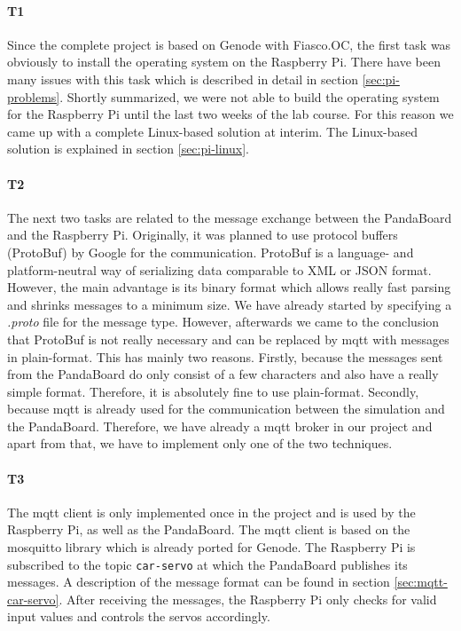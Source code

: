 \paragraph{\textbf{T1}} Since the complete project is based on Genode with Fiasco.OC, the first task was obviously to install the operating system on the Raspberry Pi. There have been many issues with this task which is described in detail in section \ref{sec:pi-problems}. Shortly summarized, we were not able to build the operating system for the Raspberry Pi until the last two weeks of the lab course. For this reason we came up with a complete Linux-based solution at interim. The Linux-based solution is explained in section \ref{sec:pi-linux}.

\paragraph{\textbf{T2}} The next two tasks are related to the message exchange between the PandaBoard and the Raspberry Pi. Originally, it was planned to use protocol buffers (ProtoBuf) by Google for the communication. ProtoBuf is a language- and platform-neutral way of serializing data comparable to XML or JSON format. However, the main advantage is its binary format which allows really fast parsing and shrinks messages to a minimum size. We have already started by specifying a \textit{.proto} file for the message type. However, afterwards we came to the conclusion that ProtoBuf is not really necessary and can be replaced by mqtt with messages in plain-format. This has mainly two reasons. Firstly, because the messages sent from the PandaBoard do only consist of a few characters and also have a really simple format. Therefore, it is absolutely fine to use plain-format. Secondly, because mqtt is already used for the communication between the simulation and the PandaBoard. Therefore, we have already a mqtt broker in our project and apart from that, we have to implement only one of the two techniques.

\paragraph{\textbf{T3}} The mqtt client is only implemented once in the project and is used by the Raspberry Pi, as well as the PandaBoard. The mqtt client is based on the mosquitto library which is already ported for Genode. The Raspberry Pi is subscribed to the topic \texttt{car-servo} at which the PandaBoard publishes its messages. A description of the message format can be found in section \ref{sec:mqtt-car-servo}. After receiving the messages, the Raspberry Pi only checks for valid input values and controls the servos accordingly.


